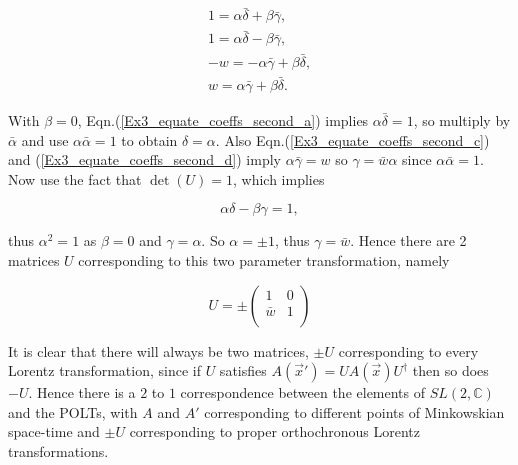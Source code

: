 \begin{subequations}
\begin{gather}\label{Ex3_equate_coeffs_second_a}
1 = \alpha \bar{\delta} + \beta\bar{\gamma}, \\\label{Ex3_equate_coeffs_second_b}
1 = \alpha \bar{\delta} - \beta\bar{\gamma},\\\label{Ex3_equate_coeffs_second_c}
-w = -\alpha\bar{\gamma} + \beta \bar{\delta},\\\label{Ex3_equate_coeffs_second_d}
w= \alpha\bar{\gamma} + \beta \bar{\delta}. 
\end{gather}
\end{subequations}

\noindent With $\beta = 0$, Eqn.(\ref{Ex3_equate_coeffs_second_a}) implies $\alpha \bar{\delta} = 1$, so multiply by $\bar{\alpha}$ and use $\alpha \bar{\alpha} = 1$ to obtain $\delta = \alpha$. Also Eqn.(\ref{Ex3_equate_coeffs_second_c}) and (\ref{Ex3_equate_coeffs_second_d}) imply $\alpha \bar{\gamma} = w$ so $\gamma = \bar{w} \alpha$ since $\alpha \bar{\alpha} = 1$. Now use the fact that $\det{(U)} = 1$, which implies

\begin{equation*}
\alpha \delta - \beta \gamma = 1,
\end{equation*}

\noindent thus $\alpha^2 = 1$ as $\beta = 0$ and $\gamma = \alpha$. So $\alpha = \pm 1$, thus $\gamma = \bar{w}$. Hence there are 2 matrices $U$ corresponding to this two parameter transformation, namely

\begin{equation*}
U = \pm
\left(
\begin{array}{cc}
1       & 0 \\
\bar{w} & 1 \\
\end{array}
\right)
\end{equation*}

It is clear that there will always be two matrices, $\pm U$ corresponding to every Lorentz transformation, since if $U$ satisfies $A(\vec{x}') = U A(\vec{x}) U^{\dagger}$ then so does $-U$. Hence there is a $2$ to $1$ correspondence between the elements of $SL(2,\mathbb{C})$ and the POLTs, with $A$ and $A'$ corresponding to different points of Minkowskian space-time and $\pm U$ corresponding to proper orthochronous Lorentz transformations.  
